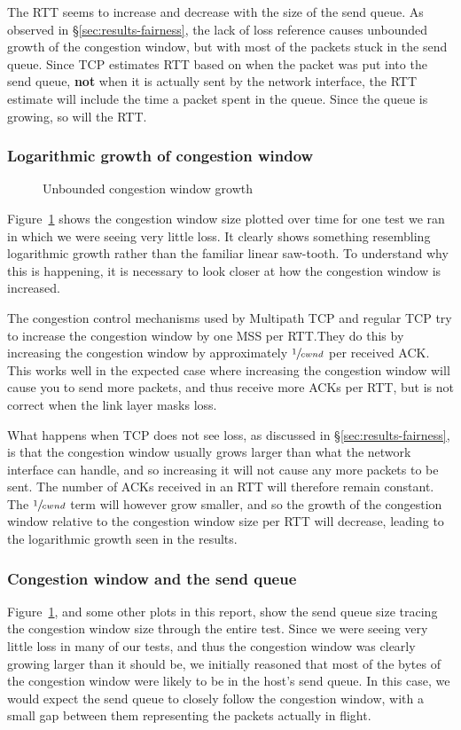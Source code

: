 The RTT seems to increase and decrease with the size of the send queue. As 
observed in \S\ref{sec:results-fairness}, the lack of loss reference causes 
unbounded growth of the congestion window, but with most of the packets stuck in 
the send queue. Since TCP estimates RTT based on when the packet was put into 
the send queue, \textbf{not} when it is actually sent by the network interface, 
the RTT estimate will include the time a packet spent in the queue. Since the 
queue is growing, so will the RTT.

\subsubsection{Logarithmic growth of congestion window}

\begin{figure}[h]
 \centering
 
 \caption{Unbounded congestion window growth}\label{graph:logarithmic}
\end{figure}

Figure~\ref{graph:logarithmic} shows the congestion window size plotted over
time for one test we ran in which we were seeing very little loss. It clearly
shows something resembling logarithmic growth rather than the familiar linear
saw-tooth. To understand why this is happening, it is necessary to look closer
at how the congestion window is increased.

The congestion control mechanisms used by Multipath TCP and regular TCP try to
increase the congestion window by one MSS per RTT.\@ They do this by increasing
the congestion window by approximately $\sfrac{1}{cwnd}$ per received ACK.\@
This works well in the expected case where increasing the congestion window will
cause you to send more packets, and thus receive more ACKs per RTT, but is not
correct when the link layer masks loss.

What happens when TCP does not see loss, as discussed in \S\ref{sec:results-fairness}, 
is that the congestion window usually grows larger than what the network 
interface can handle, and so increasing it will not cause any more packets to be 
sent. The number of ACKs received in an RTT will therefore remain constant. The 
$\sfrac{1}{cwnd}$ term will however grow smaller, and so the growth of the 
congestion window relative to the congestion window size per RTT will decrease, 
leading to the logarithmic growth seen in the results.

\subsubsection{Congestion window and the send queue}
\label{sec:closing:sendq}
Figure~\ref{graph:logarithmic}, and some other plots in this report, show the
send queue size tracing the congestion window size through the entire test.
Since we were seeing very little loss in many of our tests, and thus the
congestion window was clearly growing larger than it should be, we initially
reasoned that most of the bytes of the congestion window were likely to be in
the host's send queue. In this case, we would expect the send queue to closely
follow the congestion window, with a small gap between them representing the
packets actually in flight.

